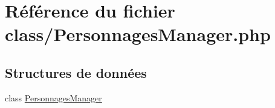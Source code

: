 \hypertarget{_personnages_manager_8php}{}\section{Référence du fichier class/\+Personnages\+Manager.php}
\label{_personnages_manager_8php}
\subsection*{Structures de données}
\begin{DoxyCompactItemize}
\item 
class \mbox{\hyperlink{class_personnages_manager}{Personnages\+Manager}}
\end{DoxyCompactItemize}
